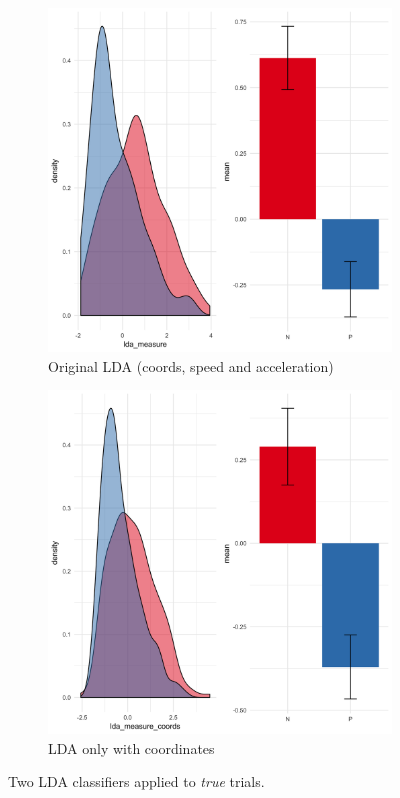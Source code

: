 \documentclass{article}
\begin{document}
\begin{itemize}
\begin{figure}
\centering
\begin{subfigure}[b]{0.45\textwidth}
\includegraphics[width=\textwidth]{LDA-negation.png}
\caption{Original LDA (coords, speed and acceleration) }
\end{subfigure}
\begin{subfigure}[b]{0.45\textwidth}
\includegraphics[width=\textwidth]{LDA-coords-negation.png}
\caption{LDA only with coordinates}
\end{subfigure}
\caption{Two LDA classifiers applied to \textit{true} trials. }
\label{fig:lda_negation}
\end{figure}

\end{itemize}
\end{document}

